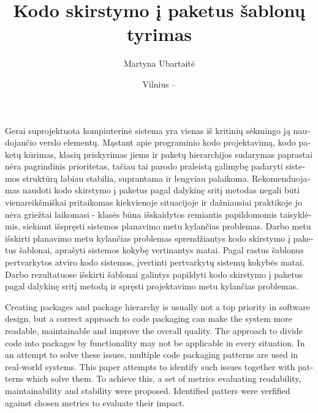 \documentclass[
]{VUMIFPSbakalaurinis}
\title{Kodo skirstymo į paketus šablonų tyrimas}
\author{Martyna Ubartaitė}
\date{Vilnius – \the\year}
\begin{document}
\maketitle


\begin{lithuanian}
Gerai suprojektuota kompiuterinė sistema yra vienas iš kritinių sėkmingo ją naudojančio verslo
elementų.
Mąstant apie programinio kodo
projektavimą, kodo paketų kūrimas, klasių priskyrimas jiems ir paketų hierarchijos sudarymas paprastai
nėra pagrindinis prioritetas, tačiau tai parodo praleistą galimybę padaryti sistemos struktūrą labiau
stabilia, suprantama ir lengviau palaikoma.
Rekomenduojamas naudoti kodo skirstymo į paketus pagal dalykinę sritį metodas negali būti vienareikšmiškai pritaikomas
kiekvienoje situacijoje ir dažniausiai praktikoje jo nėra griežtai laikomasi - klasės būna išskaidytos remiantis papildomomis taisyklėmis,
siekiant išspręsti sistemos planavimo metu kylančias problemas.
Darbo metu išskirti planavimo metu kylančias problemas sprendžiantys kodo skirstymo į paketus šablonai, aprašyti sistemos
kokybę vertinantys matai.
Pagal rastus šablonus pertvarkytos atviro kodo sistemos, įvertinti pertvarkytų sistemų kokybės matai.
Darbo rezultatuose išskirti šablonai galintys papildyti kodo skirstymo į paketus pagal dalykinę sritį metodą ir spręsti
projektavimo metu kylančias problemas.

\end{lithuanian}

\begin{english}
Creating packages and package hierarchy is usually not a top priority in software design, but
a correct approach to code packaging can make the system more readable, maintainable and improve the overall quality.
The approach to divide code into packages by functionality may not be applicable in every situation.
In an attempt to solve these issues, multiple code packaging patterns are used in real-world systems.
This paper attempts to identify such issues together with patterns which solve them.
To achieve this, a set of metrics evaluating readability, maintainability and stability were proposed.
Identified patters were verfified against chosen metrics to evaluate their impact.

\end{english}
\end{document}

